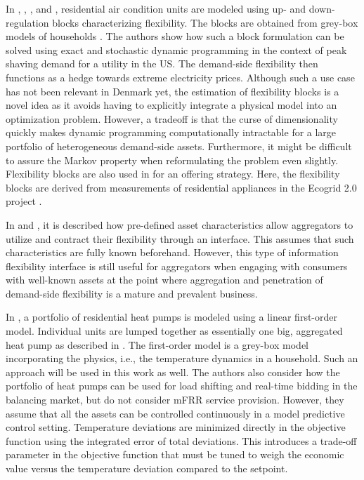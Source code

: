 In \cite{schaperow2019simulation}, \cite{chanpiwat2020using}, \cite{moglen2020optimal}, and \cite{moglen2020optimal}, residential air condition units are modeled using up- and down-regulation blocks characterizing flexibility. The blocks are obtained from grey-box models of households \cite{siemann2013performance}. The authors show how such a block formulation can be solved using exact and stochastic dynamic programming in the context of peak shaving demand for a utility in the US. The demand-side flexibility then functions as a hedge towards extreme electricity prices. Although such a use case has not been relevant in Denmark yet, the estimation of flexibility blocks is a novel idea as it avoids having to explicitly integrate a physical model into an optimization problem. However, a tradeoff is that the curse of dimensionality quickly makes dynamic programming computationally intractable for a large portfolio of heterogeneous demand-side assets. Furthermore, it might be difficult to assure the Markov property \cite{MarkovProperty} when reformulating the problem even slightly. Flexibility blocks are also used in \cite{bobo2018offering} for an offering strategy. Here, the flexibility blocks are derived from measurements of residential appliances in the Ecogrid 2.0 project \cite{ecogrid}.

In \cite{biegel2013information} and \cite{BiegelConstractingFlexServices}, it is described how pre-defined asset characteristics allow aggregators to utilize and contract their flexibility through an interface. This assumes that such characteristics are fully known beforehand. However, this type of information flexibility interface is still useful for aggregators when engaging with consumers with well-known assets at the point where aggregation and penetration of demand-side flexibility is a mature and prevalent business.

In \cite{biegel2013electricity}, a portfolio of residential heat pumps is modeled using a linear first-order model. Individual units are lumped together as essentially one big, aggregated heat pump as described in \cite{biegel2013lumped}. The first-order model is a grey-box model incorporating the physics, i.e., the temperature dynamics in a household. Such an approach will be used in this work as well. The authors also consider how the portfolio of heat pumps can be used for load shifting and real-time bidding in the balancing market, but do not consider mFRR service provision. However, they assume that all the assets can be controlled continuously in a  model predictive control  setting. Temperature deviations are minimized directly in the objective function using the integrated error of total deviations. This introduces a trade-off parameter in the objective function that must be tuned to weigh the economic value versus the temperature deviation compared to the setpoint.

